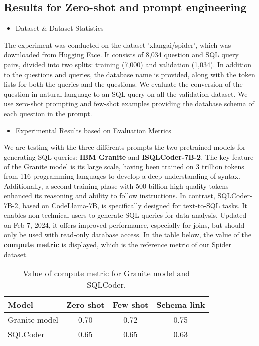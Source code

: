\documentclass[12pt,a4paper]{article}
\begin{document}
\subsection*{Results for Zero-shot and prompt engineering}

\begin{itemize}
  \item Dataset \& Dataset Statistics
  \end{itemize}
  The experiment was conducted on the dataset 'xlangai/spider', which was downloaded from Hugging Face. It consists of 8,034 question and SQL query pairs, divided into two splits: training (7,000) and validation (1,034). In addition to the questions and queries, the database name is provided, along with the token lists for both the queries and the questions. We evaluate the conversion of the question in natural language to an SQL query on all the validation dataset. We use zero-shot prompting and few-shot examples providing the database schema of each question in the prompt.
  
  \begin{itemize}
  \item Experimental Results based on Evaluation Metrics
  \end{itemize}
  We are testing with the three différents prompts the two pretrained models for generating SQL queries: \textbf{IBM Granite} and \textbf{ISQLCoder-7B-2}.
The key feature of the Granite model is its large scale, having been trained on 3 trillion tokens from 116 programming languages to develop a deep understanding of syntax. Additionally, a second training phase with 500 billion high-quality tokens enhanced its reasoning and ability to follow instructions.
In contrast, SQLCoder-7B-2, based on CodeLlama-7B, is specifically designed for text-to-SQL tasks. It enables non-technical users to generate SQL queries for data analysis. Updated on Feb 7, 2024, it offers improved performance, especially for joins, but should only be used with read-only database access. In the table below, the value of the \textbf{compute metric} is displayed, which is the reference metric of our Spider dataset.\\

\begin{table}[h]
    \centering
    \small
    \begin{tabular}{|l|c|c|c|}
        \hline
        \textbf{Model} & \textbf{Zero shot} & \textbf{Few shot} & \textbf{Schema link} \\ \hline
        Granite model & 0.70 & 0.72 & 0.75 \\ \hline
        SQLCoder    & 0.65 & 0.65 & 0.63 \\ \hline
    \end{tabular}
    \caption{Value of compute metric for Granite model and SQLCoder.}
    \label{tab:evaluation_metrics}
\end{table}\\
\end{document}
